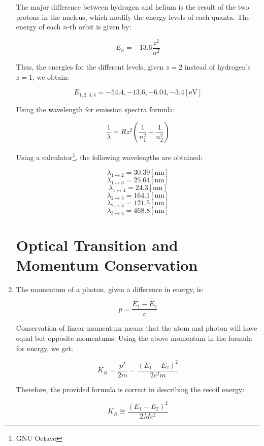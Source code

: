 \begin{enumerate}
    The major difference between hydrogen and helium is the result of the two protons in the nucleus, which modify the energy levels of each quanta. The energy of each $n$-th orbit is given by:

    $$E_n=-13.6\frac{z^2}{n^2}$$

    Thus, the energies for the different levels, given $z=2$ instead of hydrogen's $z=1$, we obtain:

    $$E_{1,2,3,4}=-54.4,-13.6,-6.04,-3.4[\si{\eV}]$$

    Using the wavelength for emission spectra formula:

    $$\frac{1}{\lambda}=Rz^2\left( \frac{1}{n_1^2}-\frac{1}{n_2^2} \right)$$

    Using a calculator\footnote{GNU Octave}, the following wavelengths are obtained:

    $$\lambda_{1\leftrightarrow2}=30.39[\si{\nano\meter}]$$
    $$\lambda_{1\leftrightarrow3}=25.64[\si{\nano\meter}]$$
    $$\lambda_{1\leftrightarrow4}=24.3[\si{\nano\meter}]$$
    $$\lambda_{2\leftrightarrow3}=164.1[\si{\nano\meter}]$$
    $$\lambda_{2\leftrightarrow4}=121.5[\si{\nano\meter}]$$
    $$\lambda_{3\leftrightarrow4}=468.8[\si{\nano\meter}]$$

    \section{Optical Transition and Momentum Conservation}

  \item The momentum of a photon, given a difference in energy, is:

    $$p=\frac{E_1-E_2}{c}$$

    Conservation of linear momentum means that the atom and photon will have equal but opposite momentums. Using the above momentum in the formula for energy, we get:

    $$K_R=\frac{p^2}{2m}=\frac{(E_1-E_2)^2}{2c^2m}$$

    Therefore, the provided formula is correct in describing the recoil energy:

    $$K_R\cong\frac{(E_1-E_2)^2}{2Mc^2}$$

\end{enumerate}



